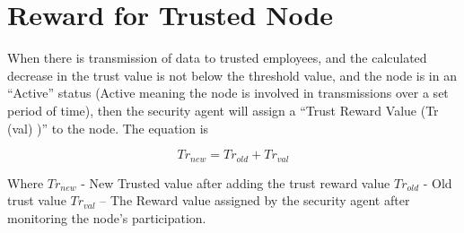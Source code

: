 \section{Reward for Trusted Node}
When there is transmission of data to trusted employees, and the calculated decrease in the trust value is not below the threshold value, and the node is in an “Active” status (Active meaning the node is involved in transmissions over a set period of time), then the security agent will assign a “Trust Reward Value (Tr (val) )” to the node. The equation is 

\begin{equation}
    \label{eq:trusted_node_reward}
    Tr_{new} = Tr_{old} + Tr_{val}
\end{equation}

Where \( Tr_{new} \) - New Trusted value after adding the trust reward value
 \( Tr_{old} \) - Old trust value
 \( Tr_{val} \) – The Reward value assigned by the security agent after monitoring the node’s participation.

